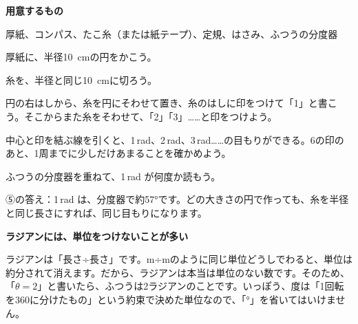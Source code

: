 \begin{yattemiyou}[ラジアンの分度器を作ろう]
\noindent\begin{minipage}[c]{0.6\linewidth}
\textbf{用意するもの}\par
厚紙、コンパス、たこ糸（または紙テープ）、定規、はさみ、ふつうの分度器
\begin{enumerate}[label={\bkcircled[bkGreen]{\arabic*}}, leftmargin=2.4\zw, itemsep=1pt, topsep=3pt]
\item 厚紙に、半径\qty{10}{cm}の円をかこう。
\item 糸を、半径と同じ\qty{10}{cm}に切ろう。
\item 円の右はしから、糸を円にそわせて置き、糸のはしに印をつけて「1」と書こう。そこからまた糸をそわせて、「2」「3」……と印をつけよう。
\item 中心と印を結ぶ線を引くと、1\,rad、2\,rad、3\,rad……の目もりができる。6の印のあと、1周までに少しだけあまることを確かめよう。
\item ふつうの分度器を重ねて、1\,rad が何度か読もう。
\end{enumerate}
\end{minipage}\hfill
\begin{minipage}[c]{0.36\linewidth}\centering
{}
\end{minipage}
\par\vspace{3pt}
⑤の答え：1\,rad は、分度器で約57°です。どの大きさの円で作っても、糸を半径と同じ長さにすれば、同じ目もりになります。
\end{yattemiyou}

\begin{seikaku}
\textbf{ラジアンには、単位をつけないことが多い}\par
ラジアンは「長さ÷長さ」です。m÷mのように同じ単位どうしでわると、単位は約分されて消えます。だから、ラジアンは本当は単位のない数です。そのため、「$\theta=2$」と書いたら、ふつうは2ラジアンのことです。いっぽう、度は「1回転を360に分けたもの」という約束で決めた単位なので、「°」を省いてはいけません。
\end{seikaku}

